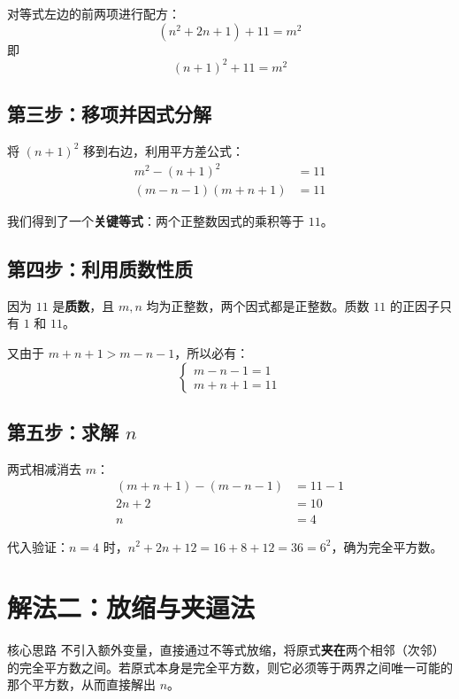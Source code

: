\documentclass[11pt,a4paper]{ctexart}
\newcommand{\highlight}[1]{\colorbox{accent!20}{\sffamily\bfseries #1}}
\begin{document}
对等式左边的前两项进行配方：
\[
  (n^2 + 2n + 1) + 11 = m^2
\]
即
\[
  (n+1)^2 + 11 = m^2
\]

\subsection*{第三步：移项并因式分解}

将 $(n+1)^2$ 移到右边，利用平方差公式：
\begin{align*}
  m^2 - (n+1)^2 &= 11 \\[4pt]
  (m - n - 1)(m + n + 1) &= 11
\end{align*}

我们得到了一个\highlight{关键等式}：两个正整数因式的乘积等于 $11$。

\subsection*{第四步：利用质数性质}

因为 $11$ 是\highlight{质数}，且 $m,n$ 均为正整数，两个因式都是正整数。质数 $11$ 的正因子只有 $1$ 和 $11$。

又由于 $m + n + 1 > m - n - 1$，所以必有：
\[
  \begin{cases}
    m - n - 1 = 1 \\[4pt]
    m + n + 1 = 11
  \end{cases}
\]

\subsection*{第五步：求解 $n$}

两式相减消去 $m$：
\begin{align*}
  (m + n + 1) - (m - n - 1) &= 11 - 1 \\
  2n + 2 &= 10 \\
  n &= 4
\end{align*}

代入验证：$n=4$ 时，$n^2 + 2n + 12 = 16 + 8 + 12 = 36 = 6^2$，确为完全平方数。

\newpage

\section{解法二：放缩与夹逼法}

\begin{methodbox}{核心思路}
不引入额外变量，直接通过不等式放缩，将原式\highlight{夹在}两个相邻（次邻）的完全平方数之间。若原式本身是完全平方数，则它必须等于两界之间唯一可能的那个平方数，从而直接解出 $n$。
\end{methodbox}
\end{document}
